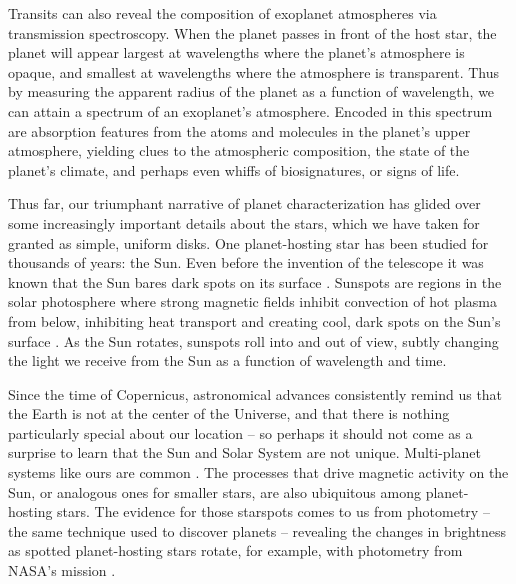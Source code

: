 Transits can also reveal the composition of exoplanet atmospheres via transmission spectroscopy. When the planet passes in front of the host star, the planet will appear largest at wavelengths where the planet's atmosphere is opaque, and smallest at wavelengths where the atmosphere is transparent. Thus by measuring the apparent radius of the planet as a function of wavelength, we can attain a spectrum of an exoplanet's atmosphere. Encoded in this spectrum are absorption features from the atoms and molecules in the planet's upper atmosphere, yielding clues to the atmospheric composition, the state of the planet's climate, and perhaps even whiffs of biosignatures, or signs of life.

Thus far, our triumphant narrative of planet characterization has glided over some increasingly important details about the stars, which we have taken for granted as simple, uniform disks. One planet-hosting star has been studied for thousands of years: the Sun. Even before the invention of the telescope it was known that the Sun bares dark spots on its surface \citep{Hayakawa2017}. Sunspots are regions in the solar photosphere where strong magnetic fields inhibit convection of hot plasma from below, inhibiting heat transport and creating cool, dark spots on the Sun's surface \citep{Solanki2003}. As the Sun rotates, sunspots roll into and out of view, subtly changing the light we receive from the Sun as a function of wavelength and time.

Since the time of Copernicus, astronomical advances consistently remind us that the Earth is not at the center of the Universe, and that there is nothing particularly special about our location \citep{Copernicus1543} -- so perhaps it should not come as a surprise to learn that the Sun and Solar System are not unique. Multi-planet systems like ours are common \citep{Dressing2013,Burke2015,Coughlin2016}. The processes that drive magnetic activity on the Sun, or analogous ones for smaller stars, are also ubiquitous among planet-hosting stars. The evidence for those starspots comes to us from photometry -- the same technique used to discover planets -- revealing the changes in brightness as spotted planet-hosting stars rotate, for example, with photometry from NASA's \kepler mission \citep{Walkowicz2013,McQuillan2013,Giles2017}.  

